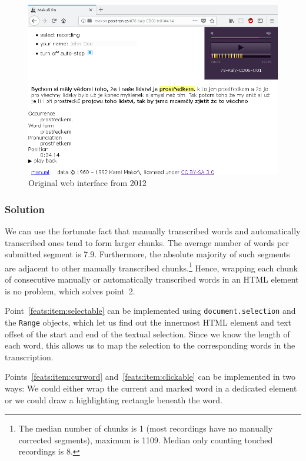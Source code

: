 \documentclass{svproc}
\begin{document}
\begin{figure}[htpb]
\includegraphics[scale=0.7]{rc/makonfm-en-1.png}
\caption{Original web interface from 2012}
\label{fig:makonfm}
\end{figure}

\subsubsection{Solution}

We can use the fortunate fact that manually transcribed words and automatically
transcribed ones tend to form larger chunks. The average number of words per
submitted segment is 7.9. Furthermore, the absolute majority of such segments
are adjacent to other manually transcribed chunks.\footnote{
The median number of chunks is 1 (most recordings have no manually corrected
segments), maximum is 1109. Median only counting touched recordings is 8.}
Hence, wrapping each chunk of consecutive manually or automatically transcribed
words in an HTML element is no problem, which solves
point~2.

Point~\ref{feats:item:selectable} can be implemented using
\texttt{document.selection} and the \texttt{Range} objects, which let us find
out the innermost HTML element and text offset of the start and end of the
textual selection. Since we know the length of each word, this allows us to map
the selection to the corresponding words in the transcription.

Points~\ref{feats:item:curword} and~\ref{feats:item:clickable} can be
implemented in two ways: We could either wrap the current and marked word in a
dedicated element or we could draw a highlighting rectangle beneath the word.
\end{document}
